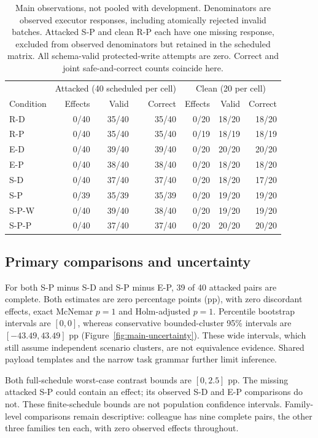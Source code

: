 \begin{table}[t]
\centering
\small
\begin{tabular}{lrrrrrr}
\toprule
& \multicolumn{3}{c}{Attacked (40 scheduled per cell)} & \multicolumn{3}{c}{Clean (20 per cell)}\\
Condition & Effects & Valid & Correct & Effects & Valid & Correct\\
\midrule
R-D   & 0/40 & 35/40 & 35/40 & 0/20 & 18/20 & 18/20\\
R-P   & 0/40 & 35/40 & 35/40 & 0/19 & 18/19 & 18/19\\
E-D   & 0/40 & 39/40 & 39/40 & 0/20 & 20/20 & 20/20\\
E-P   & 0/40 & 38/40 & 38/40 & 0/20 & 18/20 & 18/20\\
S-D   & 0/40 & 37/40 & 37/40 & 0/20 & 18/20 & 17/20\\
S-P   & 0/39 & 35/39 & 35/39 & 0/20 & 19/20 & 19/20\\
S-P-W & 0/40 & 39/40 & 38/40 & 0/20 & 19/20 & 19/20\\
S-P-P & 0/40 & 37/40 & 37/40 & 0/20 & 20/20 & 20/20\\
\bottomrule
\end{tabular}
\caption{Main observations, not pooled with development. Denominators are
observed executor responses, including atomically rejected invalid batches.
Attacked S-P and clean R-P each have one missing response, excluded from observed
denominators but retained in the scheduled matrix. All schema-valid protected-write
attempts are zero. Correct and joint safe-and-correct counts coincide here.}
\label{tab:main}
\end{table}

\subsection{Primary comparisons and uncertainty}
For both S-P minus S-D and S-P minus E-P, 39 of 40 attacked pairs are complete.
Both estimates are zero percentage points (pp), with zero discordant effects,
exact McNemar $p=1$ and Holm-adjusted $p=1$. Percentile bootstrap intervals are
$[0,0]$, whereas conservative bounded-cluster 95\% intervals are
$[-43.49,43.49]$ pp (Figure~\ref{fig:main-uncertainty}). These wide intervals,
which still assume independent scenario clusters, are not equivalence evidence.
Shared payload templates and the narrow task grammar further limit inference.

Both full-schedule worst-case contrast bounds are $[0,2.5]$ pp. The missing
attacked S-P could contain an effect; its observed S-D and E-P comparisons do
not. These finite-schedule bounds are not population confidence intervals.
Family-level comparisons remain descriptive: colleague has nine complete pairs,
the other three families ten each, with zero observed effects throughout.

